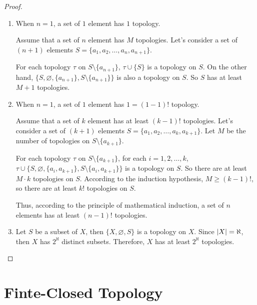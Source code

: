 \begin{proof}
    \begin{enumerate}[label={(\roman*)}]
        \item When $n = 1$, a set of $1$ element has $1$ topology.

              Assume that a set of $n$ element has $M$ topologies. Let's consider a set of $(n+1)$ elements $S = \{ a_{1}, a_{2}, \ldots, a_{n}, a_{n+1} \}$.

              For each topology $\tau$ on $S\setminus\{ a_{n+1} \}$, $\tau\cup\{ S \}$ is a topology on $S$. On the other hand, $\{ S, \varnothing, \{ a_{n+1} \}, S\setminus\{ a_{n+1} \} \}$ is also a topology on $S$. So $S$ has at least $M+1$ topologies.
        \item When $n = 1$, a set of $1$ element has $1 = (1-1){!}$ topology.

              Assume that a set of $k$ element has at least $(k-1){!}$ topologies. Let's consider a set of $(k+1)$ elements $S = \{ a_{1}, a_{2}, \ldots, a_{k}, a_{k+1} \}$. Let $M$ be the number of topologies on $S\setminus\{a_{k+1}\}$.

              For each topology $\tau$ on $S\setminus\{ a_{k+1} \}$, for each $i = 1, 2, \ldots, k$, $\tau\cup\{ S, \varnothing, \{ a_{i}, a_{k+1} \}, S\setminus\{ a_{i}, a_{k+1} \} \}$ is a topology on $S$. So there are at least $M\cdot k$ topologies on $S$. According to the induction hypothesis, $M\geq (k-1){!}$, so there are at least $k{!}$ topologies on $S$.

              Thus, according to the principle of mathematical induction, a set of $n$ elements has at least $(n-1){!}$ topologies.
        \item Let $S$ be a subset of $X$, then $\{ X, \varnothing, S \}$ is a topology on $X$. Since $\left\vert{X}\right\vert = \aleph$, then $X$ has $2^{\aleph}$ distinct subsets. Therefore, $X$ has at least $2^{\aleph}$ topologies.
    \end{enumerate}
\end{proof}
\newpage

\section{Finte-Closed Topology}

